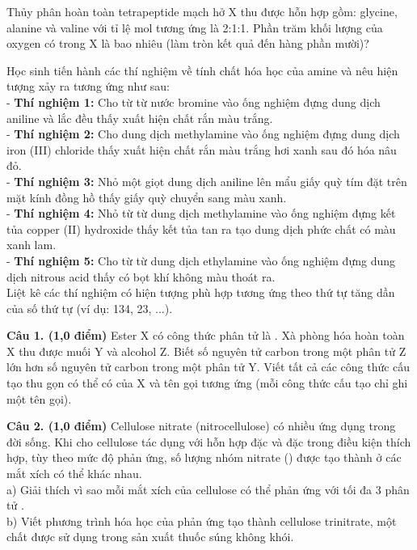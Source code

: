 \documentclass[11pt,a4paper]{article}
\begin{document}
\begin{ex}
Thủy phân hoàn toàn tetrapeptide mạch hở X thu được hỗn hợp gồm: glycine, alanine và valine với tỉ lệ mol tương ứng là 2:1:1. Phần trăm khối lượng của oxygen có trong X là bao nhiêu (làm tròn kết quả đến hàng phần mười)?
\loigiai{}
\end{ex}

\begin{ex}
Học sinh tiến hành các thí nghiệm về tính chất hóa học của amine và nêu hiện tượng xảy ra tương ứng như sau:\\
- \textbf{Thí nghiệm 1:} Cho từ từ nước bromine vào ống nghiệm đựng dung dịch aniline và lắc đều thấy xuất hiện chất rắn màu trắng.\\
- \textbf{Thí nghiệm 2:} Cho dung dịch methylamine vào ống nghiệm đựng dung dịch iron (III) chloride thấy xuất hiện chất rắn màu trắng hơi xanh sau đó hóa nâu đỏ.\\
- \textbf{Thí nghiệm 3:} Nhỏ một giọt dung dịch aniline lên mẩu giấy quỳ tím đặt trên mặt kính đồng hồ thấy giấy quỳ chuyển sang màu xanh.\\
- \textbf{Thí nghiệm 4:} Nhỏ từ từ dung dịch methylamine vào ống nghiệm đựng kết tủa copper (II) hydroxide thấy kết tủa tan ra tạo dung dịch phức chất có màu xanh lam.\\
- \textbf{Thí nghiệm 5:} Cho từ từ dung dịch ethylamine vào ống nghiệm đựng dung dịch nitrous acid thấy có bọt khí không màu thoát ra.\\
Liệt kê các thí nghiệm có hiện tượng phù hợp tương ứng theo thứ tự tăng dần của số thứ tự (ví dụ: 134, 23, ...).
\loigiai{}
\end{ex}

\vspace{6pt}
\vspace{4pt}

\noindent\textbf{Câu 1. (1,0 điểm)} Ester X có công thức phân tử là . Xà phòng hóa hoàn toàn X thu được muối Y và alcohol Z. Biết số nguyên tử carbon trong một phân tử Z lớn hơn số nguyên tử carbon trong một phân tử Y. Viết tất cả các công thức cấu tạo thu gọn có thể có của X và tên gọi tương ứng (mỗi công thức cấu tạo chỉ ghi một tên gọi).

\vspace{6pt}

\vspace{6pt}
\noindent\textbf{Câu 2. (1,0 điểm)} Cellulose nitrate (nitrocellulose) có nhiều ứng dụng trong đời sống. Khi cho cellulose tác dụng với hỗn hợp  đặc và  đặc trong điều kiện thích hợp, tùy theo mức độ phản ứng, số lượng nhóm nitrate () được tạo thành ở các mắt xích có thể khác nhau.\\
a) Giải thích vì sao mỗi mắt xích  của cellulose có thể phản ứng với tối đa 3 phân tử .\\
b) Viết phương trình hóa học của phản ứng tạo thành cellulose trinitrate, một chất được sử dụng trong sản xuất thuốc súng không khói.
\end{document}
